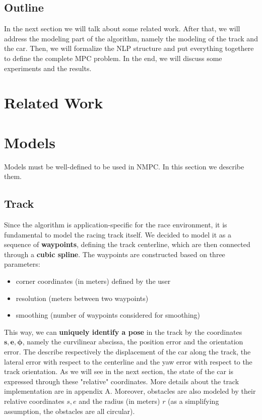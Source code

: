 \documentclass[a4paper, onecolumn, 12pt]{article}
\begin{document}
\subsection*{Outline}

In the next section we will talk about some related work. After that, we will
address the modeling part of the algorithm, namely the modeling of the track and
the car. Then, we will formalize the NLP structure and put everything togethere
to define the complete MPC problem. In the end, we will discuss some experiments
and the results.

\section{Related Work}

\newpage
\section{Models}

Models must be well-defined to be used in NMPC. In this section we describe
them.

\subsection{Track}
\label{subsec:track}

Since the algorithm is application-specific for the race environment, it is
fundamental to model the racing track itself. We decided to model it as a
sequence of \textbf{waypoints}, defining the track centerline, which are then
connected through a \textbf{cubic spline}. The waypoints are constructed based
on three parameters:
\begin{itemize}
    \item corner coordinates (in meters) defined by the user
    \item resolution (meters between two waypoints)
    \item smoothing (number of waypoints considered for smoothing)
\end{itemize}
This way, we can \textbf{uniquely identify a pose} in the track by the
coordinates $\mathbf{s,e,\phi}$, namely the curvilinear abscissa, the position
error and the orientation error. The describe respectively the displacement of
the car along the track, the lateral error with respect to the centerline and
the yaw error with respect to the track orientation. As we will see in the next
section, the state of the car is expressed through these "relative" coordinates.
More details about the track implementation are in appendix A. Moreover, obstacles are also
modeled by their relative coordinates $s,e$ and the radius (in meters) $r$ (as a
simplifying assumption, the obstacles are all circular).
\end{document}
